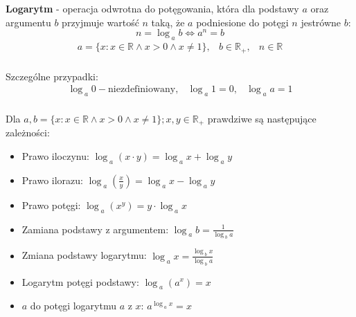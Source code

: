 \documentclass[14pt,a4paper]{extarticle}
\begin{document}
\renewcommand{\arraycolsep}{0.5cm}

\noindent\textbf{Logarytm} - operacja odwrotna do potęgowania, która dla podstawy $a$ oraz argumentu $b$ przyjmuje wartość $n$ taką, że $a$ podniesione do potęgi $n$ jest\linebreak równe $b$:
$$n = \log_{\;a}b \Leftrightarrow a^{n} = b$$
\begin{equation*}
\begin{array}{ccc}
   a=\{x:x\in\mathbb{R}\land x>0\land x\neq 1\}, & b \in \mathbb{R}_{+}, & n \in \mathbb{R} \\
\end{array}
\end{equation*}

\noindent Szczególne przypadki:
\begin{equation*}
\begin{array}{ccc}
   \log_{\;a}0 - \text{niezdefiniowany}, & \log_{\;a}1 = 0, & \log_{\;a}a = 1 \\
\end{array}
\end{equation*}

\renewcommand{\arraycolsep}{0.8cm}
\newpage
\noindent Dla $a, b =\{x:x\in\mathbb{R}\land x>0\land x\neq 1\}; x, y \in \mathbb{R}_{+}$ prawdziwe są następujące zależności:

\begin{itemize}
   \item Prawo iloczynu: $\log_{\;a}(x\cdot y) = \log_{\;a}x + \log_{\;a}y$
   \item Prawo ilorazu: $\log_{\;a}\left(\frac{\displaystyle x}{\displaystyle y}\right) = \log_{\;a}x - \log_{\;a}y$
   \item Prawo potęgi: $\log_{\;a}(x^{y}) = y\cdot\log_{\;a}x$
   \item Zamiana podstawy z argumentem: $\log_{\;a}b = \frac{\displaystyle 1}{\displaystyle \log_{\;b}a}$
   \item Zmiana podstawy logarytmu: $\log_{\;a}x = \frac{\displaystyle \log_{\;b}x}{\displaystyle \log_{\;b}a}$
   \item Logarytm potęgi podstawy: $\log_{\;a}(a^{x}) = x$
   \item $a$ do potęgi logarytmu $a$ z $x$: $a^{\log_{\;a}x} = x$
\end{itemize}
\end{document}
